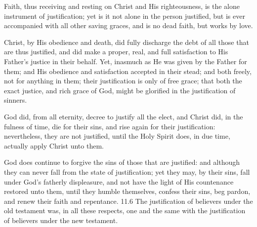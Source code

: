 \begin{outerlst}[left=0pt,labelsep=0pt]
\begin{innerlst}[resume*]
\item Faith, thus receiving and resting on Christ and His righteousness, is the alone instrument of justification; yet is it not alone in the person justified, but is ever accompanied with all other saving graces, and is no dead faith, but works by love.   

\item Christ, by His obedience and death, did fully discharge the debt of all those that are thus justified, and did make a proper, real, and full satisfaction to His Father{}'s justice in their behalf. Yet, inasmuch as He was given by the Father for them; and His obedience and satisfaction accepted in their stead; and both freely, not for anything in them; their justification is only of free grace; that both the exact justice, and rich grace of God, might be glorified in the justification of sinners.   

\item God did, from all eternity, decree to justify all the elect, and Christ did, in the fulness of time, die for their sins, and rise again for their justification: nevertheless, they are not justified, until the Holy Spirit does, in due time, actually apply Christ unto them.   

\item God does continue to forgive the sins of those that are justified: and although they can never fall from the state of justification; yet they may, by their sins, fall under God's fatherly displeasure, and not have the light of His countenance restored unto them, until they humble themselves, confess their sins, beg pardon, and renew their faith and repentance.   11.6 The justification of believers under the old testament was, in all these respects, one and the same with the justification of believers under the new testament.  
\end{innerlst}


\end{outerlst}
